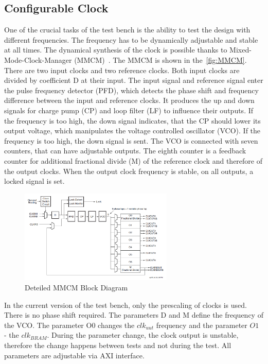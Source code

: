 \subsection{Configurable Clock}
One of the crucial tasks of the test bench is the ability to test the design with different frequencies. The frequency has to be dynamically adjustable and stable at all times. The dynamical synthesis of the clock is possible thanks to Mixed-Mode-Clock-Manager (MMCM)~\cite{manual:MMCM}. The MMCM is shown in the~\autoref{fig:MMCM}. There are two input clocks and two reference clocks. Both input clocks are divided by coefficient D at their input. The input signal and reference signal enter the pulse frequency detector (PFD), which detects the phase shift and frequency difference between the input and reference clocks. It produces the up and down signals for charge pump (CP) and loop filter (LF) to influence their outputs. If the frequency is too high, the down signal indicates, that the CP should lower its output voltage, which manipulates the voltage controlled oscillator (VCO). If the frequency is too high, the down signal is sent. The VCO is connected with seven counters, that can have adjustable outputs. The eighth counter is a feedback counter for additional fractional divide (M) of the reference clock and therefore of the output clocks. When the output clock frequency is stable, on all outputs, a locked signal is set.

\begin{figure}[h]
\centering
\includegraphics[width=0.65\textwidth]{figures/MMCM.png}
\caption{Deteiled MMCM Block Diagram~\cite{manual:MMCM}}
\label{fig:MMCM}
\end{figure}

In the current version of the test bench, only the prescaling of clocks is used. There is no phase shift required. The parameters D and M define the frequency of the VCO. The parameter O0 changes the $clk_{uut}$ frequency and the parameter $O1$ - the $clk_{BRAM}$. During the parameter change, the clock output is unstable, therefore the change happens between tests and not during the test. All parameters are adjustable via AXI interface. 

